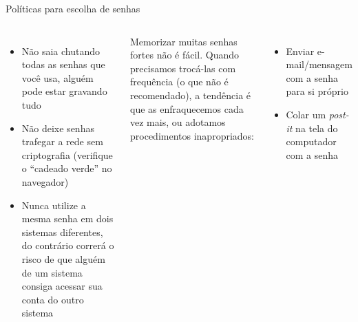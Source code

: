 \documentclass[utf8]{beamer}
\begin{document}
\begin{frame}{Políticas para escolha de senhas}
  \begin{columns}[c]
    \begin{itemize}
      \item Não saia chutando todas as senhas que você usa,
            alguém pode estar gravando tudo
      \item Não deixe senhas trafegar a rede sem criptografia
            (verifique o ``cadeado verde'' no navegador)
      \item Nunca utilize a mesma senha em dois sistemas diferentes,
            do contrário correrá o risco de que alguém de um sistema
            consiga acessar sua conta do outro sistema
    \end{itemize}
    Memorizar muitas senhas fortes não é fácil.
    Quando precisamos trocá-las com frequência
    (o que não é recomendado),
    a tendência é que as enfraquecemos cada vez mais,
    ou adotamos procedimentos inapropriados:
    \begin{itemize}
      \item Enviar e-mail/mensagem com a senha para si próprio
      \item Colar um \emph{post-it} na tela do computador com a senha
    \end{itemize}
  \end{columns}
\end{frame}
\end{document}
